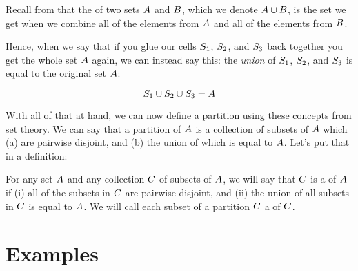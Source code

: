 \documentclass[../../../main.tex]{subfiles}
\begin{document}
\begin{terminology}
  Recall from  that the  of two sets $A$ and $B$, which we denote $A \cup B$, is the set we get when we combine all of the elements from $A$ and all of the elements from $B$.
\end{terminology}

Hence, when we say that if you glue our cells $S_{1}$, $S_{2}$, and $S_{3}$ back together you get the whole set $A$ again, we can instead say this: the \emph{union} of $S_{1}$, $S_{2}$, and $S_{3}$ is equal to the original set $A$:

\begin{equation*}
  S_{1} \cup S_{2} \cup S_{3} = A
\end{equation*}

With all of that at hand, we can now define a partition using these concepts from set theory. We can say that a partition of $A$ is a collection of subsets of $A$ which (a) are pairwise disjoint, and (b) the union of which is equal to $A$. Let's put that in a definition:

\begin{fdefinition}[Partition]
  \label{def:partition}
  For any set $A$ and any collection $C$ of subsets of $A$, we will say that $C$ is a  of $A$ if (i) all of the subsets in $C$ are pairwise disjoint, and (ii) the union of all subsets in $C$ is equal to $A$. We will call each subset of a partition $C$ a  of $C$.
\end{fdefinition}


\section{Examples}
\end{document}
